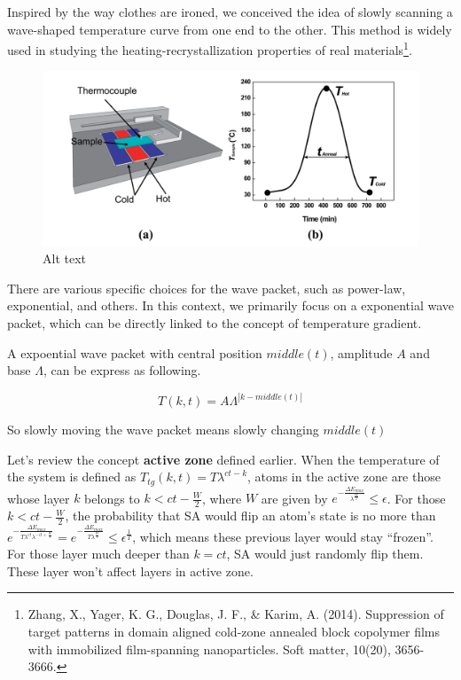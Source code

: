 \documentclass[twocolumn,superscriptaddress,english,showpacs,longbibliography]{revtex4-2}
\begin{document}
Inspired by the way clothes are ironed, we conceived the idea of slowly
scanning a wave-shaped temperature curve from one end to the other. This
method is widely used in studying the heating-recrystallization
properties of real materials\footnote{Zhang, X., Yager, K. G., Douglas,
  J. F., \& Karim, A. (2014). Suppression of target patterns in domain
  aligned cold-zone annealed block copolymer films with immobilized
  film-spanning nanoparticles. Soft matter, 10(20), 3656-3666.}.

\begin{figure}
\centering
\includegraphics[keepaspectratio]{../notes/images/zhang2014.png}
\caption{Alt text}
\end{figure}

There are various specific choices for the wave packet, such as
power-law, exponential, and others. In this context, we primarily focus
on a exponential wave packet, which can be directly linked to the
concept of temperature gradient.

A expoential wave packet with central position $middle(t)$, amplitude
$A$ and base $\Lambda$, can be express as following.

\[
T(k,t) = A\Lambda^{|k-middle(t)|}
\]

So slowly moving the wave packet means slowly changing $middle(t)$

Let's review the concept \textbf{active zone} defined earlier. When the
temperature of the system is defined as
$T_{tg}(k, t) = T\lambda^{ct-k}$, atoms in the active zone are those
whose layer $k$ belongs to $k<ct - \frac{W}{2}$, where $W$ are
given by
$e^{-\frac{\Delta E_{max}}{\lambda^{\frac{W}{2}}}}\leq \epsilon$. For
those $k<ct - \frac{W}{2}$, the probability that SA would flip an
atom's state is no more than
$e^{-\frac{\Delta E_{max}}{T\lambda^{ct}\lambda^{-ct + \frac{W}{2}}}}=e^{-\frac{\Delta E_{max}}{T\lambda^{\frac{W}{2}}}}\leq \epsilon^{\frac{1}{T}}$,
which means these previous layer would stay ``frozen''. For those layer
much deeper than $k = ct$, SA would just randomly flip them. These
layer won't affect layers in active zone.
\end{document}
